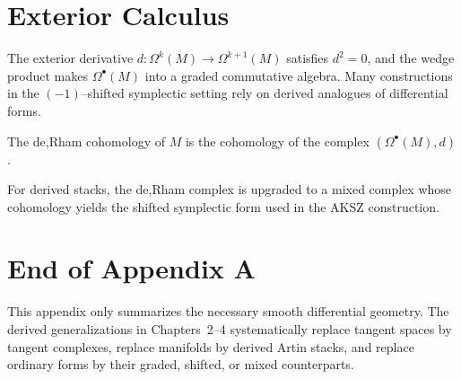 \section{Exterior Calculus}

The exterior derivative $d:\Omega^k(M)\to\Omega^{k+1}(M)$ satisfies $d^2=0$, and the wedge product makes $\Omega^\bullet(M)$ into a graded commutative algebra.  Many constructions in the $(-1)$--shifted symplectic setting rely on derived analogues of differential forms.

\begin{definition}
The de,Rham cohomology of $M$ is the cohomology of the complex $(\Omega^\bullet(M),d)$.
\end{definition}

\begin{remark}
For derived stacks, the de,Rham complex is upgraded to a mixed complex whose cohomology yields the shifted symplectic form used in the AKSZ construction.
\end{remark}

\section{End of Appendix A}

This appendix only summarizes the necessary smooth differential geometry. The derived generalizations in Chapters~2--4 systematically replace tangent spaces by tangent complexes, replace manifolds by derived Artin stacks, and replace ordinary forms by their graded, shifted, or mixed counterparts.

